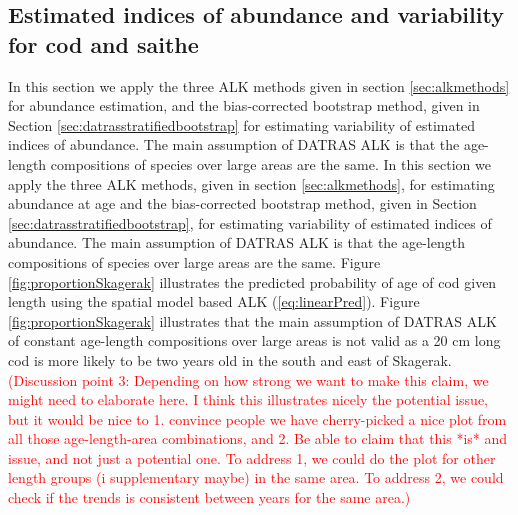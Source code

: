 \documentclass[a4paper 12pt]{article}
\numberwithin{equation}{section}
\newcommand{\ed}[1]{\textcolor{red}{#1}}
\begin{document}
\subsection{Estimated indices of abundance and variability for cod and saithe}
\label{sec:codresults}
In this section we apply the three ALK methods given in section \ref{sec:alkmethods} for abundance estimation, and the bias-corrected bootstrap method, given in Section \ref{sec:datrasstratifiedbootstrap} for estimating variability of estimated indices of abundance. The main assumption of DATRAS ALK is that the age-length compositions of species over large areas are the same. In this section we apply the three ALK methods, given in section \ref{sec:alkmethods}, for estimating abundance at age and the bias-corrected bootstrap method, given in Section \ref{sec:datrasstratifiedbootstrap}, for estimating variability of estimated indices of abundance.  The main assumption of DATRAS ALK is that the age-length compositions of species over large areas are the same. Figure \ref{fig:proportionSkagerak} illustrates the predicted probability of age of cod given length using the spatial model based ALK  (\ref{eq:linearPred}).  Figure \ref{fig:proportionSkagerak} illustrates that the main assumption of DATRAS ALK of constant age-length compositions over large areas is not valid as a 20 cm long cod is more likely to be two years old in the south and east of Skagerak. \ed{(Discussion point 3: Depending on how strong we want to make this claim, we might need to elaborate here. I think this illustrates nicely the potential issue, but it would be nice to 1. convince people we have cherry-picked a nice plot from all those age-length-area combinations, and 2. Be able to claim that this *is* and issue, and not just a potential one. To address 1, we could do the plot for other length groups (i supplementary maybe) in the same area. To address 2, we could check if the trends is consistent between years for the same area.)}
\end{document}

